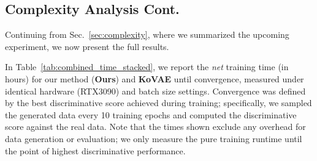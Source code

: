 \documentclass{article}
\theoremstyle{plain}
\theoremstyle{definition}
\theoremstyle{remark}
\begin{document}
\begin{table}[!t]
    \centering
    \small %
    \setlength{\tabcolsep}{2pt} %
    \caption{Wasserstein distances between original data clusters, generated samples, and clusters from KoVAE for various missing rates $(30\%, 50\%, 70\%)$ and sequence lengths. Lower values indicate better similarity.}
    \label{tab:wass_dist}
    
\end{table}


\clearpage

\subsection{Complexity Analysis Cont.}
\label{sec:complexity_analyis_cont}
Continuing from Sec.~\ref{sec:complexity}, where we summarized the upcoming experiment, we now present the full results.

In Table~\ref{tab:combined_time_stacked}, we report the  \emph{net} training time (in hours) for our method (\textbf{Ours}) and \textbf{KoVAE} until convergence, measured under identical hardware (RTX3090) and batch size settings. Convergence was defined by the best discriminative score achieved during training; specifically, we sampled the generated data every 10 training epochs and computed the discriminative score against the real data. Note that the times shown exclude any overhead for data generation or evaluation; we only measure the pure training runtime until the point of highest discriminative performance.
\end{document}
